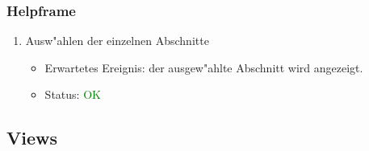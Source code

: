 \subsubsection{Helpframe}
\begin{enumerate}
\item Ausw"ahlen der einzelnen Abschnitte
\begin{itemize}
\item Erwartetes Ereignis: der ausgew"ahlte Abschnitt wird angezeigt.
\item Status: \textcolor{green}{OK}
\end{itemize}
\end{enumerate}

\subsection{Views}
